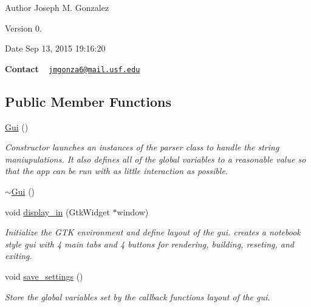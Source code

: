 \begin{DoxyAuthor}{Author}
Joseph M. Gonzalez
\end{DoxyAuthor}
\begin{DoxyVersion}{Version}
0.
\end{DoxyVersion}
\begin{DoxyDate}{Date}
Sep 13, 2015 19\+:16\+:20
\end{DoxyDate}
{\bfseries Contact} ~\newline
 \href{mailto:jmgonza6@mail.usf.edu}{\tt jmgonza6@mail.\+usf.\+edu} \subsection*{Public Member Functions}
\begin{DoxyCompactItemize}
\item 
\hyperlink{class_gui_ab2655dbb6d3a91d7e90cb83dad6c0450}{Gui} ()
\begin{DoxyCompactList}\small\item\em Constructor launches an instances of the parser class to handle the string maniupulations. It also defines all of the global variables to a reasonable value so that the app can be run with as little interaction as possible. \end{DoxyCompactList}\item 
\hyperlink{class_gui_a4fd8485d226f9b8a2ac2d81d7f0f3598}{$\sim$\+Gui} ()
\item 
void \hyperlink{class_gui_a4fa5f2bbb698866797f66f002627aae0}{display\+\_\+in} (Gtk\+Widget $\ast$window)
\begin{DoxyCompactList}\small\item\em Initialize the G\+T\+K environment and define layout of the gui. creates a notebook style gui with 4 main tabs and 4 buttons for rendering, building, reseting, and exiting. \end{DoxyCompactList}\item 
void \hyperlink{class_gui_a1c73249d03432a2fedd220c0b8c9269b}{save\+\_\+settings} ()
\begin{DoxyCompactList}\small\item\em Store the global variables set by the callback functions layout of the gui. \end{DoxyCompactList}\end{DoxyCompactItemize}
